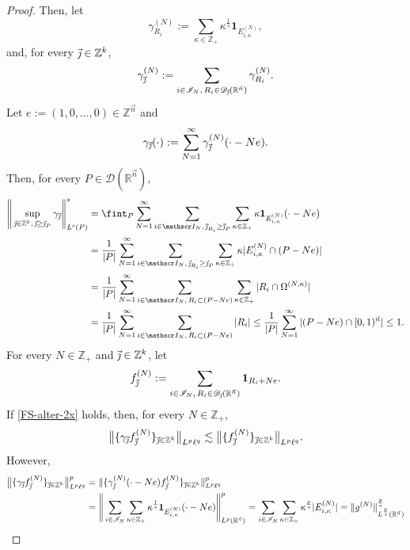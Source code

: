 \documentclass[11pt, reqno]{amsart}
\theoremstyle{definition}
\theoremstyle{remark}
\numberwithin{equation}{section}
\newcommand{\D}{\mathscr D}
\newcommand{\R}{\mathbb R}
\newcommand{\vj}{\vec{\textit{\j}}}
\newcommand{\vn}{\vec n}
\newcommand{\aveL}{\textit{\L}}
\newcommand{\Norm}[2]{\|#1\|_{#2}}
\newcommand{\bNorm}[2]{\big\|#1\big\|_{#2}}
\begin{document}
\begin{proof}
Then, let
\begin{equation*}
\gamma_{R_i}^{(N)}:= \sum_{\kappa\in\mathbb Z_+}
\kappa^{\frac1s} \mathbf 1_{E_{i,\kappa}^{(N)}},
\end{equation*}
and, for every $\vj\in\mathbb Z^k$,
$$
\gamma_{\vj}^{(N)}:= \sum_{i\in \mathscr I_N,\,R_i\in \D_{\vj}(\R^{\vn})}  \gamma_{R_i}^{(N)}.
$$
Let $e:=(1,0,\ldots,0)\in\mathbb Z^{\vec n}$ and
$$
\gamma_{\vj}(\cdot):=\sum_{N=1}^\infty \gamma_{\vj}^{(N)}(\cdot-Ne).
$$
Then, for every $P\in \D(\mathbb R^{\vec n})$,
\begin{equation*}
\begin{split}
\Bigg\|\sup_{\vj\in\mathbb Z^k,\,\vj\geq \vj_P}
\gamma_{\vj}\Bigg\|_{\aveL^s(P)}^s
&= \fint_P \sum_{N=1}^\infty \sum_{i\in \mathscr I_N,\,\vj_{R_i}\geq \vj_P}
\sum_{\kappa\in\mathbb Z_+}
\kappa \mathbf 1_{E_{i,\kappa}^{(N)}}(\cdot-Ne)\\
&= \frac{1}{|P|} \sum_{N=1}^\infty \sum_{i\in \mathscr I_N,\,\vj_{R_i}\geq \vj_P}
\sum_{\kappa\in\mathbb Z_+}
\kappa |E_{i,\kappa}^{(N)} \cap (P-Ne)| \\
&= \frac{1}{|P|} \sum_{N=1}^\infty \sum_{i\in \mathscr I_N,\,R_i \subset (P-Ne)}
\sum_{\kappa\in\mathbb Z_+} |R_i\cap\Omega^{(N,\kappa)}| \\
&= \frac{1}{|P|} \sum_{N=1}^\infty \sum_{i\in \mathscr I_N,\,R_i \subset (P-Ne)} |R_i|
\leq \frac{1}{|P|} \sum_{N=1}^\infty |(P-Ne) \cap [0,1)^{\vec n}|
\leq 1.
\end{split}
\end{equation*}
For every $N\in\mathbb Z_+$ and $\vj\in\mathbb Z^k$, let
$$
f_{\vj}^{(N)}:=\sum_{i\in \mathscr I_N,\,R_i\in \D_{\vj}(\mathbb R^{\vec n})} \mathbf 1_{R_i+Ne}.
$$
If \eqref{FS-alter-2x} holds, then, for every $N\in\mathbb Z_+$,
$$
\bNorm{\{\gamma_{\vj}f_{\vj}^{(N)}\}_{\vj\in\mathbb Z^k}}{L^p\ell^q}
\lesssim \bNorm{\{ f_{\vj}^{(N)}\}_{\vj\in\mathbb Z^k}}{L^p\ell^q}.
$$
However,
\begin{equation*}
\begin{split}
\bNorm{\{\gamma_{\vj}f_{\vj}^{(N)}\}_{\vj\in\mathbb Z^k}}{L^p\ell^q}^p
&=\|\{\gamma_{\vj}^{(N)}(\cdot-Ne)f_{\vj}^{(N)}\}_{\vj\in\mathbb Z^k}\|_{L^p\ell^q}^p \\
&=\Bigg\| \sum_{i\in \mathscr I_N} \sum_{\kappa\in\mathbb Z_+}
\kappa^{\frac 1s} \mathbf 1_{E_{i,\kappa}^{(N)}}(\cdot-Ne)
\Bigg\|_{L^p(\mathbb R^{\vec n})}^p
= \sum_{i\in \mathscr I_N} \sum_{\kappa\in\mathbb Z_+}
\kappa^{\frac ps} |E_{i,\kappa}^{(N)}|
=\Norm{g^{(N)}}{L^{\frac ps}(\R^{\vn})}^{\frac ps}
\end{split}

\end{equation*}
\end{proof}
\end{document}
